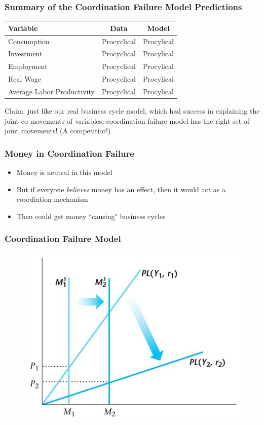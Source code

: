 \documentclass{beamer}
\begin{document}
\begin{frame}
\frametitle[alignment=center]{Summary of the Coordination Failure Model Predictions}
\begin{table}
\centering
\begin{tabular}{lcc}
\hline\hline
Variable & Data & Model \\
\hline
Consumption & Procyclical & Procylical \\
Investment & Procyclical & Procylical \\
Employment & Procyclical & Procylical \\
Real Wage & Procyclical & Procylical \\
Average Labor Productivity & Procyclical & Procylical \\
\hline\hline
\end{tabular}
\end{table}
Claim:  just like our real business cycle model, which had success in explaining the joint co-movements of variables, coordination failure model has the right set of joint movements!  (A competitior!)
\end{frame}

\begin{frame}
\frametitle[alignment=center]{Money in Coordination Failure}
\begin{itemize}
\item Money is neutral in this model
\bigskip
\item But if everyone \emph{believes} money has an effect, then it would act as a coordiation mechanism
\bigskip
\item Then could get money ``causing" business cycles
\end{itemize}
\end{frame}


\begin{frame}
\frametitle[alignment=center]{Coordination Failure Model}
\begin{figure}
\centering
\includegraphics[scale=0.65]{Figures/W_Fig_13pt11.png}
\end{figure}
\end{frame}
\end{document}
